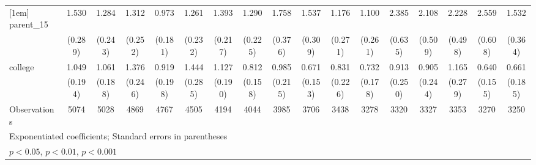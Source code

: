 {\begin{tabular}{l*{16}{c}}
[1em]
parent\_15           &       1.530\sym{*}  &       1.284         &       1.312         &       0.973         &       1.261         &       1.393\sym{*}  &       1.290         &       1.758\sym{**} &       1.537\sym{*}  &       1.176         &       1.100         &       2.385\sym{**} &       2.108\sym{**} &       2.228\sym{***}&       2.559\sym{***}&       1.532         \\
                    &     (0.289)         &     (0.243)         &     (0.252)         &     (0.181)         &     (0.232)         &     (0.217)         &     (0.225)         &     (0.376)         &     (0.309)         &     (0.271)         &     (0.261)         &     (0.635)         &     (0.509)         &     (0.498)         &     (0.608)         &     (0.364)         \\
[1em]
college             &       1.049         &       1.061         &       1.376         &       0.919         &       1.444         &       1.127         &       0.812         &       0.985         &       0.671         &       0.831         &       0.732         &       0.913         &       0.905         &       1.165         &       0.640         &       0.661         \\
                    &     (0.194)         &     (0.188)         &     (0.246)         &     (0.198)         &     (0.285)         &     (0.190)         &     (0.158)         &     (0.215)         &     (0.153)         &     (0.226)         &     (0.178)         &     (0.250)         &     (0.244)         &     (0.279)         &     (0.155)         &     (0.185)         \\
\hline
Observations        &        5074         &        5028         &        4869         &        4767         &        4505         &        4194         &        4044         &        3985         &        3706         &        3438         &        3278         &        3320         &        3327         &        3353         &        3270         &        3250         \\
\hline\hline
\multicolumn{17}{l}{\footnotesize Exponentiated coefficients; Standard errors in parentheses}\\
\multicolumn{17}{l}{\footnotesize \sym{*} \(p<0.05\), \sym{**} \(p<0.01\), \sym{***} \(p<0.001\)}\\
\end{tabular}
}
